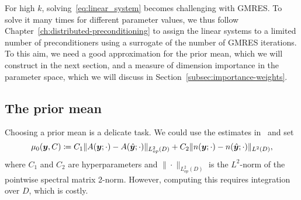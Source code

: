 For high $k$, solving~\eqref{eq:linear_system} becomes challenging with GMRES\@.
To solve it many times for different parameter values, we thus follow Chapter~\ref{ch:distributed-preconditioning} to assign the linear systems to a limited number of preconditioners using a surrogate of the number of GMRES iterations.
To this aim, we need a good approximation for the prior mean, which we will construct in the next section, and a measure of dimension importance in the parameter space, which we will discuss in Section~\ref{subsec:importance-weights}.

\subsection{The prior mean}\label{subsec:prior-mean}
Choosing a prior mean is a delicate task.
We could use the estimates in~\cite{graham2021} and set
\begin{equation}
    \mu_0({\bm{y}},C)\coloneqq C_1 \|A({\bm{y}}; \cdot) - A(\hat{{\bm{y}}};\cdot)\|_{L^2_{op}(D)}+C_2 \|n({\bm{y}}; \cdot) - n(\hat{{\bm{y}}};\cdot)\|_{L^2(D)}\label{eq:GP-mean-def},
\end{equation}
where $C_1$ and $C_2$ are hyperparameters and $\|\cdot\|_{L^2_{op}(D)}$ is the $L^2$-norm of the pointwise spectral matrix 2-norm.
However, computing this requires integration over $D$, which is costly.

